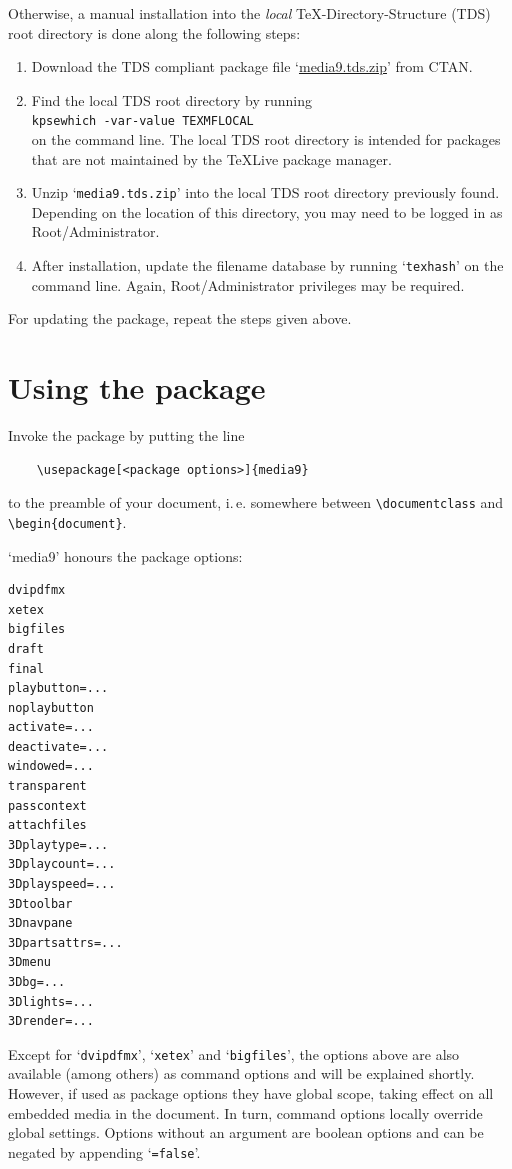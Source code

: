 \documentclass[a4paper]{article}
\begin{document}
Otherwise, a manual installation into the \emph{local} TeX-Directory-Structure (TDS) root directory is done along the following steps:
\begin{enumerate}
  \item Download the TDS compliant package file `\href{http://mirror.ctan.org/install/macros/latex/contrib/media9.tds.zip}{media9.tds.zip}' from CTAN.
  \item Find the local TDS root directory by running\\
  {\tt\phantom{xx}kpsewhich -var-value TEXMFLOCAL}\\
  on the command line. The local TDS root directory is intended for packages that are not maintained by the \TeX{}Live package manager.
  \item Unzip `\verb+media9.tds.zip+' into the local TDS root directory previously found. Depending on the location of this directory, you may need to be logged in as Root/Administrator.
  \item After installation, update the filename database by running `{\tt texhash}' on the command line. Again, Root/Administrator privileges may be required.
\end{enumerate}
For updating the package, repeat the steps given above.

\section{Using the package}\label{pkguse}
Invoke the package by putting the line
\begin{verbatim}
    \usepackage[<package options>]{media9}
\end{verbatim}
to the preamble of your document, i.\,e. somewhere between \verb+\documentclass+ and \verb+\begin{document}+.

`media9' honours the package options:
\begin{verbatim}
dvipdfmx
xetex
bigfiles
draft
final
playbutton=...
noplaybutton
activate=...
deactivate=...
windowed=...
transparent
passcontext
attachfiles
3Dplaytype=...
3Dplaycount=...
3Dplayspeed=...
3Dtoolbar
3Dnavpane
3Dpartsattrs=...
3Dmenu
3Dbg=...
3Dlights=...
3Drender=...
\end{verbatim}
Except for `\verb+dvipdfmx+', `\verb+xetex+' and `\verb+bigfiles+', the options above are also available (among others) as command options and will be explained shortly. However, if used as package options they have global scope, taking effect on all embedded media in the document. In turn, command options locally override global settings. Options without an argument are boolean options and can be negated by appending `\verb+=false+'.
\end{document}
